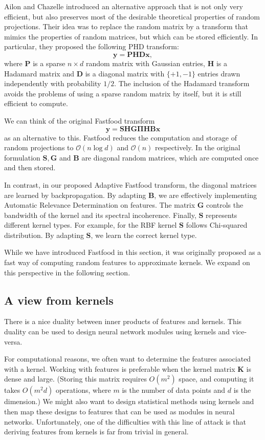\documentclass[10pt,twocolumn,letterpaper]{article}
\newcommand{\myvec}[1]{\mathbf{#1}}
\newcommand{\myvecsym}[1]{\boldsymbol{#1}}
\newcommand{\vPi}{\myvecsym{\Pi}}
\newcommand{\vx}{\myvec{x}}
\newcommand{\vy}{\myvec{y}}
\newcommand{\vB}{\myvec{B}}
\newcommand{\vD}{\myvec{D}}
\newcommand{\vG}{\myvec{G}}
\newcommand{\vH}{\myvec{H}}
\newcommand{\vK}{\myvec{K}}
\newcommand{\vP}{\myvec{P}}
\newcommand{\vS}{\myvec{S}}
\newcommand{\be}{\begin{equation}}
\newcommand{\ee}{\end{equation}}
\begin{document}
Ailon and Chazelle \cite{Ailon2009} introduced 
an alternative approach that is not only very efficient, but also preserves most of the desirable theoretical properties of random projections. Their idea was to replace the random matrix by a transform that mimics the properties of random matrices, but which can be stored efficiently. In particular, they proposed the following PHD transform:
\be
\vy = \vP \vH \vD \vx,
\ee
where $\vP$ is a sparse $n \times d$ random matrix with Gaussian entries, $\vH$ is a Hadamard matrix and $\vD$ is a diagonal matrix with $\{+1,-1\}$ entries drawn independently with probability $1/2$. The inclusion of the Hadamard transform avoids the problems of using a sparse random matrix by itself, but it is still efficient to compute.

We can think of the original Fastfood transform
\be
\vy = \vS\vH\vG\vPi \vH\vB \vx
\ee
as an alternative to this. Fastfood reduces the computation and storage of random projections to
$\mathcal{O}(n \log d)$ and $\mathcal{O}(n)$ respectively. In the original formulation $\vS, \vG$ and  $\vB$ are diagonal random matrices, which are computed once and then stored. 

In contrast, in our proposed Adaptive Fastfood transform, the diagonal matrices are learned by backpropagation. By adapting $\vB$, we are effectively implementing  Automatic Relevance
Determination on features. The matrix $\vG$ controls the bandwidth of the kernel and its spectral incoherence. Finally, $\vS$ represents different kernel types. For example, for the RBF kernel $\vS$ follows Chi-squared distribution. By adapting $\vS$, we learn the correct kernel type.

While we have introduced Fastfood in this section, it was originally proposed as a fast way of computing random features to approximate kernels. We expand on this perspective in the following section.  
  

\subsection{A view from kernels}

There is a nice duality between inner products of features and kernels. This duality can be used to design neural network modules using kernels and vice-versa. 

For computational reasons, we often want to determine the features associated with a kernel. Working with features is preferable when the kernel matrix $\vK$ is dense and large. (Storing this matrix requires
$O(m^2)$ space, and computing it takes $O(m^2 d)$ operations, where $m$ is the
number of data points and $d$ is the dimension.) We might also want to design statistical methods using kernels and then map these designs to features that can be used as modules in neural networks. Unfortunately, one of the difficulties with this line of attack is that deriving features from kernels is far from trivial in general.
\end{document}
